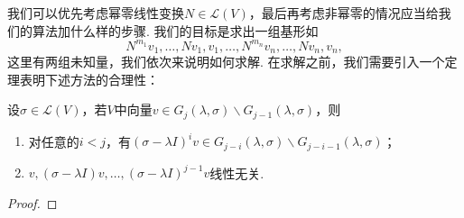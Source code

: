 我们可以优先考虑幂零线性变换$N\in \mathcal{L}(V)$，最后再考虑非幂零的情况应当给我们的算法加什么样的步骤. 我们的目标是求出一组基形如
\[N^{m_1}v_1,\ldots,Nv_1,v_1,\ldots,N^{m_n}v_n,\ldots,Nv_n,v_n,\]
这里有两组未知量，我们依次来说明如何求解. 在求解之前，我们需要引入一个定理表明下述方法的合理性：
\begin{theorem}
    设$\sigma\in \mathcal{L}(V)$，若$V$中向量$v\in G_j(\lambda,\sigma)\backslash G_{j-1}(\lambda,\sigma)$，则
    \begin{enumerate}
        \item 对任意的$i<j$，有$(\sigma-\lambda I)^iv\in G_{j-i}(\lambda,\sigma)\backslash G_{j-i-1}(\lambda,\sigma)$；

        \item $v,(\sigma-\lambda I)v,\ldots,(\sigma-\lambda I)^{j-1}v$线性无关.
    \end{enumerate}
\end{theorem}

\begin{proof}

\end{proof}

